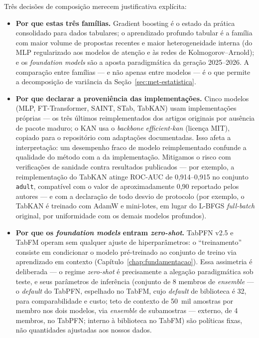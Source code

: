 Três decisões de composição merecem justificativa explícita:

\begin{itemize}
  \item \textbf{Por que estas três famílias.} Gradient boosting é o estado
    da prática consolidado para dados tabulares; o aprendizado profundo
    tabular é a família com maior volume de propostas recentes e maior
    heterogeneidade interna (do MLP regularizado aos modelos de atenção e às
    redes de Kolmogorov--Arnold); e os \emph{foundation models} são a aposta
    paradigmática da geração 2025--2026. A comparação entre famílias ---
    e não apenas entre modelos --- é o que permite a decomposição de
    variância da Seção~\ref{sec:met-estatistica}.
  \item \textbf{Por que declarar a proveniência das implementações.} Cinco
    modelos (MLP, FT-Transformer, SAINT, STab, TabKAN) usam implementações
    próprias --- os três últimos reimplementados dos artigos originais por
    ausência de pacote maduro; o KAN usa o \emph{backbone}
    \emph{efficient-kan} (licença MIT), copiado para o repositório com adaptações
    documentadas. Isso afeta a interpretação: um desempenho fraco de modelo
    reimplementado confunde a qualidade do método com a da implementação.
    Mitigamos o risco com verificações de sanidade contra resultados
    publicados --- por exemplo, a reimplementação do TabKAN atinge ROC-AUC
    de 0,914--0,915 no conjunto \texttt{adult}, compatível com o valor de
    aproximadamente 0,90 reportado pelos autores \citep{tabkan2025} --- e
    com a declaração de todo desvio de protocolo (por exemplo, o TabKAN é
    treinado com AdamW e mini-lotes, em lugar do L-BFGS \emph{full-batch}
    original, por uniformidade com os demais modelos profundos).
  \item \textbf{Por que os \emph{foundation models} entram
    \emph{zero-shot}.} TabPFN v2.5 e TabFM operam sem qualquer ajuste de
    hiperparâmetros: o ``treinamento'' consiste em condicionar o modelo
    pré-treinado ao conjunto de treino via aprendizado em contexto
    (Capítulo~\ref{chap:fundamentacao}). Essa assimetria é deliberada ---
    o regime \emph{zero-shot} é precisamente a alegação paradigmática sob
    teste, e seus parâmetros de inferência (conjunto de 8 membros de
    \emph{ensemble} --- o \emph{default} do TabPFN, espelhado no TabFM,
    cujo \emph{default} de biblioteca é 32, para comparabilidade e custo;
    teto de contexto de 50~mil amostras por membro nos dois modelos,
    via \emph{ensemble} de subamostras --- externo, de 4 membros, no
    TabPFN; interno à biblioteca no TabFM) são
    políticas fixas, não quantidades ajustadas aos nossos
    dados.
\end{itemize}

